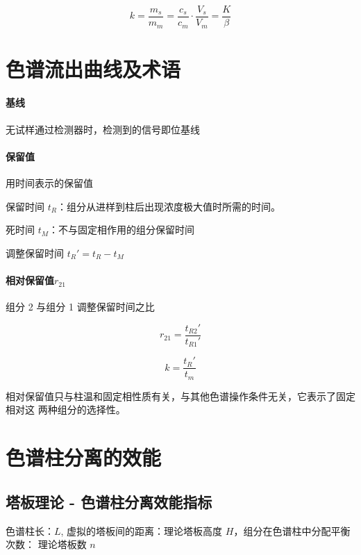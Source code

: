 \begin{equation}
    k = \frac{m_s}{m_m} = \frac{c_s}{c_m} \cdot \frac{V_s}{V_m} = \frac{K}{\beta}
\end{equation}


\section{色谱流出曲线及术语}

\paragraph{基线} 无试样通过检测器时，检测到的信号即位基线

\paragraph{保留值} 用时间表示的保留值

保留时间 $t_R$：组分从进样到柱后出现浓度极大值时所需的时间。

死时间 $t_M$：不与固定相作用的组分保留时间

调整保留时间 $t_R' = t_R - t_M$

\paragraph{相对保留值$r_{21}$} 组分 2 与组分 1 调整保留时间之比

\begin{equation}
    r_{21} = \frac{t_{R2}'}{t_{R1}'}
\end{equation}

\begin{equation}
    k = \frac{t_R'}{t_m}
\end{equation}


相对保留值只与柱温和固定相性质有关，与其他色谱操作条件无关，它表示了固定相对这
两种组分的选择性。


\section{色谱柱分离的效能}

\subsection{塔板理论 - 色谱柱分离效能指标}

色谱柱长：$L$, 虚拟的塔板间的距离：理论塔板高度 $H$，组分在色谱柱中分配平衡次数：
理论塔板数 $n$

